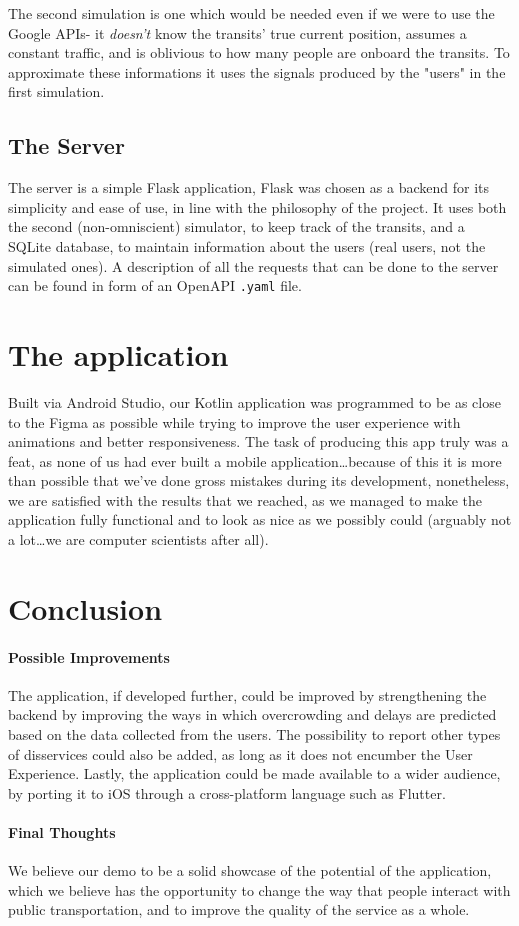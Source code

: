 \documentclass[a4paper, 11pt]{report}
\begin{document}
The second simulation is one which would be needed even if we were to use the Google APIs- it \emph{doesn't} know the transits' true current position, assumes a constant traffic, and is oblivious to how many people are onboard the transits. To approximate these informations it uses the signals produced by the "users" in the first simulation.


\subsection{The Server}\label{ssec:the-server}

The server is a simple Flask application, Flask was chosen
as a backend for its simplicity and ease of use, in line
with the philosophy of the project.
It uses both the second (non-omniscient) simulator, to keep track of the transits, and a SQLite database, to maintain information about the users (real users, not the simulated ones). A description of all the requests that can be done to the server can be found in form of an OpenAPI \texttt{.yaml} file.


\section{The application}

Built via Android Studio, our Kotlin application was programmed to be as close to the Figma as possible while trying to improve the user experience with animations and better responsiveness. The task of producing this app truly was a feat, as none of us had ever built a mobile application\dots because of this it is more than possible that we've done gross mistakes during its development, nonetheless, we are satisfied with the results that we reached, as we managed to make the application fully functional and to look as nice as we possibly could (arguably not a lot\dots we are computer scientists after all).

\section{Conclusion}\label{sec:conclusion}

\paragraph{Possible Improvements}

The application, if developed further, could be improved
by strengthening the backend by improving the ways in
which overcrowding and delays are predicted based
on the data collected from the users. The possibility
to report other types of disservices could also be
added, as long as it does not encumber the
User Experience. Lastly, the application could be
made available to a wider audience, by porting it
to iOS through a cross-platform language such as Flutter.

\paragraph{Final Thoughts}
We believe our demo to be a solid showcase of
the potential of the application, which we believe has
the opportunity to change the way that people interact
with public transportation, and to improve the quality
of the service as a whole.
\end{document}
